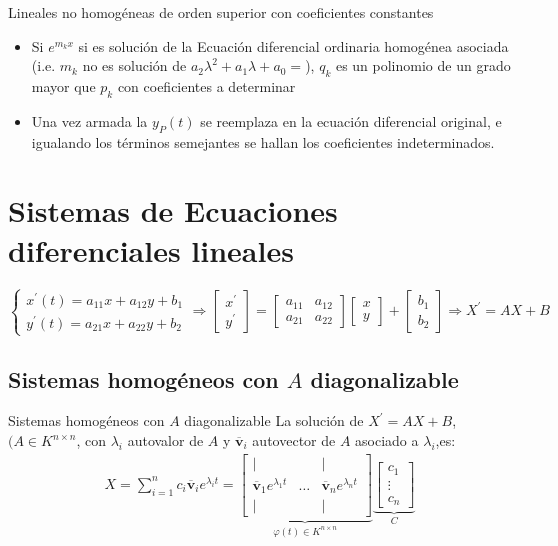 \documentclass[a4paper, twoside]{article}
\numberwithin{equation}{section}
\numberwithin{figure}{section}
\numberwithin{table}{section}
\newcommand{\vect}[1]{\overline{\textbf{#1}}}
\begin{document}
\begin{definicion*}{Lineales no homogéneas de orden superior con coeficientes constantes}
\begin{itemize}
\begin{itemize}
			\item Si $e^{m_k x}$ si es solución de la Ecuación diferencial ordinaria homogénea asociada (i.e. $m_k$ no es solución de $a_2 \lambda^2+a_1\lambda+a_0=$), $q_k$ es un polinomio de un grado mayor que $p_k$ con coeficientes a determinar
			\item Una vez armada la $y_P(t)$ se reemplaza en la ecuación diferencial original, e igualando los términos semejantes se hallan los coeficientes indeterminados.
		\end{itemize}
	\end{itemize}
\end{definicion*}

\newpage
\section{Sistemas de Ecuaciones diferenciales lineales}
$\begin{cases} x^\prime(t)=a_{11}x+a_{12}y+b_1 \\ y^\prime(t)=a_{21}x+a_{22}y+b_2 \end{cases} \Rightarrow \begin{bmatrix} {x^\prime} \\ {y^\prime} \end{bmatrix}=\begin{bmatrix} {a_{11}}&{a_{12}} \\ {a_{21}}&{a_{22}} \end{bmatrix} \begin{bmatrix} {x} \\ {y} \end{bmatrix}+\begin{bmatrix} {b_1} \\ {b_2} \end{bmatrix} \Rightarrow X^\prime=AX+B$

\subsection{Sistemas homogéneos con $A$ diagonalizable}
\begin{definicion*}{Sistemas homogéneos con $A$ diagonalizable}
	La solución de $X^\prime=AX+B$, $(A \in K^{n \times n}$, con $\lambda_i$ autovalor de $A$ y $\vect{v}_i$ autovector de $A$ asociado a $\lambda_i$,es:
	\begin{align}
		X=\sum_{i=1}^n c_i \vect{v}_i e^{\lambda_i t}=\underbrace{\begin{bmatrix}{|}&{ }&{|}\\{\vect{v}_1 e^{\lambda_1 t}}&{\ldots}&{\vect{v}_n e^{\lambda_n t}}\\{|}&{ }&{|}\end{bmatrix}}_{\varphi (t) \in K^{n \times n}} \underbrace{\begin{bmatrix} {c_1} \\ {\vdots} \\ {c_n}\end{bmatrix}}_{C}
	\end{align}
\end{definicion*}
\end{document}
